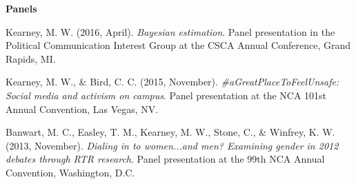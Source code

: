 {\large\textbf{Panels}} \vspace{.5em}

  \begin{bibenum}
    \item[] Kearney, M. W. (2016, April).
      \textit{Bayesian estimation}.
      Panel presentation in the Political Communication Interest Group at the CSCA Annual Conference, Grand Rapids, MI.
    \item[] Kearney, M. W., \& Bird, C. C. (2015, November).
      \textit{\#aGreatPlaceToFeelUnsafe: Social media and activism on campus}.
      Panel presentation at the NCA 101st Annual Convention, Las Vegas, NV.
    \item[] Banwart, M. C., Easley, T. M., Kearney, M. W., Stone, C., \& Winfrey, K. W. (2013, November).
      \textit{Dialing in to women...and men? Examining gender in 2012 debates through RTR research}.
      Panel presentation at the 99th NCA Annual Convention, Washington, D.C.

  \end{bibenum}

\vspace{1.5em}

